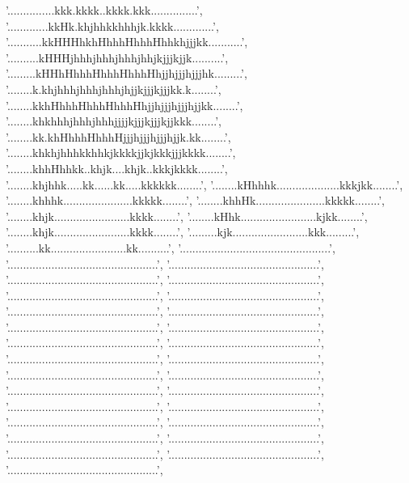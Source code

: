   '...............kkk.kkkk..kkkk.kkk...............',
  '.............kkHk.khjhhkkhhhjk.kkkk.............',
  '...........kkHHHhkhHhhhHhhhHhhkhjjjkk...........',
  '..........kHHHjhhhjhhhjhhhjhhjkjjjkjjk..........',
  '.........kHHhHhhhHhhhHhhhHhjjhjjjhjjjhk.........',
  '........k.khjhhhjhhhjhhhjhjjkjjjkjjjkk.k........',
  '........kkhHhhhHhhhHhhhHhjjhjjjhjjjhjjkk........',
  '........khkhhhjhhhjhhhjjjjkjjjkjjjkjjkkk........',
  '........kk.khHhhhHhhhHjjjhjjjhjjjhjjk.kk........',
  '........khkhjhhhkkhhkjkkkkjjkjkkkjjjkkkk........',
  '........khhHhhkk..khjk....khjk..kkkjkkkk........',
  '........khjhhk.....kk......kk.....kkkkkk........',
  '........kHhhhk....................kkkjkk........',
  '........khhhk......................kkkkk........',
  '........khhHk......................kkkkk........',
  '........khjk........................kkkk........',
  '........kHhk........................kjkk........',
  '........khjk........................kkkk........',
  '.........kjk........................kkk.........',
  '..........kk........................kk..........',
  '................................................',
  '................................................',
  '................................................',
  '................................................',
  '................................................',
  '................................................',
  '................................................',
  '................................................',
  '................................................',
  '................................................',
  '................................................',
  '................................................',
  '................................................',
  '................................................',
  '................................................',
  '................................................',
  '................................................',
  '................................................',
  '................................................',
  '................................................',
  '................................................',
  '................................................',
  '................................................',
  '................................................',
  '................................................',
  '................................................',
  '................................................',
  '................................................',
